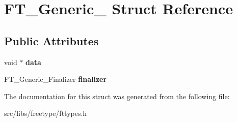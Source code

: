 \hypertarget{struct_f_t___generic__}{
\section{FT\_\-Generic\_\- Struct Reference}
\label{struct_f_t___generic__}
}
\subsection*{Public Attributes}
\begin{DoxyCompactItemize}
\item 
\hypertarget{struct_f_t___generic___af0bf8b983254b662f293e9a20505e27e}{
void $\ast$ {\bfseries data}}
\label{struct_f_t___generic___af0bf8b983254b662f293e9a20505e27e}

\item 
\hypertarget{struct_f_t___generic___a20fce8de90cc9e3876935817247b9ccc}{
FT\_\-Generic\_\-Finalizer {\bfseries finalizer}}
\label{struct_f_t___generic___a20fce8de90cc9e3876935817247b9ccc}

\end{DoxyCompactItemize}


The documentation for this struct was generated from the following file:\begin{DoxyCompactItemize}
\item 
src/libs/freetype/fttypes.h\end{DoxyCompactItemize}
